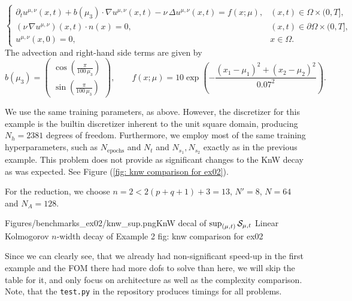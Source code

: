 \begin{equation*}
    \begin{cases}
    \displaystyle
    \partial_t u^{\mu,\nu}(x,t)
    + b(\mu_3)\cdot\nabla u^{\mu,\nu}(x,t)
    - \nu\,\Delta u^{\mu,\nu}(x,t)
    = f(x;\mu), 
    & (x,t)\in \Omega\times(0,T], \\[0.8em]
    \displaystyle
    (\nu\,\nabla u^{\mu,\nu})(x,t)\cdot n(x) = 0, 
    & (x,t)\in \partial\Omega\times(0,T], \\[0.8em]
    \displaystyle
    u^{\mu,\nu}(x,0) = 0, 
    & x\in \Omega.
    \end{cases}
\end{equation*}
The advection and right-hand side terms are given by
\begin{equation*}
    b(\mu_3) =
    \begin{pmatrix}
    \cos\left(\tfrac{\pi}{100\,\mu_3}\right) \\[0.3em]
    \sin\left(\tfrac{\pi}{100\,\mu_3}\right)
    \end{pmatrix},
    \qquad
    f(x;\mu) = 10 \exp\left(-\frac{(x_1-\mu_1)^2+(x_2-\mu_2)^2}{0.07^2}\right).
\end{equation*}

We use the same training parameters, as above. However, the discretizer for this 
example is the builtin discretizer inherent to the unit square domain, producing $N_h = 2381$ degrees of freedom.
Furthermore, we employ most of the same training hyperparameters, such as $N_\text{epochs}$ and $N_t$ and 
$N_{s_1}, N_{s_2}$ exactly as in the previous example. This problem does not provide as significant changes to the
KnW decay as was expected. See Figure (\ref{fig: knw comparison for ex02}).

For the reduction, we choose $n = 2 < 2(p+q+1) + 3 = 13$, $N' = 8$, $N = 64$ and $N_A = 128$.

%
    {Figures/benchmarks_ex02/knw_sup.png}{KnW decal of $\sup_{(\mu, t)} \mathcal{S}_{\mu, t}$}%
    {Linear Kolmogorov $n$-width decay of Example 2}
    {fig: knw comparison for ex02}

Since we can clearly see, that we already had non-significant speed-up in the first example and the
FOM there had more dofs to solve than here,
we will skip the table for it, and only focus on architecture as well as the complexity comparison. 
Note, that the \texttt{test.py} in the repository produces timings
for all problems. 

